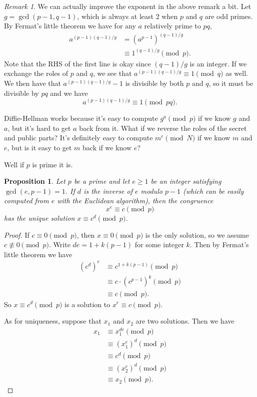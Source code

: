 \documentclass[12pt]{article}
\theoremstyle{plain}
\newtheorem{proposition}[theorem]{Proposition}
\theoremstyle{definition}
\theoremstyle{remark}
\newtheorem{remark}[theorem]{Remark}
\begin{document}
\begin{remark}\label{divide by gcd}
    We can actually improve the exponent in the above remark a bit.
    Let $g = \gcd(p-1, q-1)$, which is always at least 2 when $p$ and $q$ are odd primes.
    By Fermat's little theorem we have for any $a$ relatively prime to $pq$,
    \begin{align*}
        a^{(p-1)(q-1)/g} &= \left(a^{p-1}\right)^{(q-1)/g}\\
        &\equiv 1^{(q-1)/g}\pmod p.
    \end{align*}
    Note that the RHS of the first line is okay since $(q-1)/g$ is an integer.
    If we exchange the roles of $p$ and $q$, we see that $a^{(p-1)(q-1)/g} \equiv 1\pmod q$ as well.
    We then have that $a^{(p-1)(q-1)/g}-1$ is divisible by both $p$ and $q$, so it must be divisible by $pq$ and we have
    \[
        a^{(p-1)(q-1)/g}\equiv 1\pmod {pq}.
    \]
\end{remark}


Diffie-Hellman works because it's easy to compute $g^a\pmod p$ if we know $g$ and $a$, but it's hard to get $a$ back from it.
What if we reverse the roles of the secret and public parts?
It's definitely easy to compute $m^e\pmod N$ if we know $m$ and $e$, but is it easy to get $m$ back if we know $e$?

Well if $p$ is prime it is.

\begin{proposition}\label{roots mod p}
    Let $p$ be a prime and let $e\geq 1$ be an integer satisfying $\gcd(e, p-1) = 1$.
    If $d$ is the inverse of $e$ modulo $p-1$ (which can be easily computed from $e$ with the Euclidean algorithm), then the congruence
    \[
        x^e \equiv c\pmod p
    \]
    has the unique solution $x \equiv c^d\pmod p$.
\end{proposition}
\begin{proof}
    If $c\equiv 0\pmod p$, then $x\equiv 0\pmod p$ is the only solution, so we assume $c\not\equiv 0\pmod p$.
    Write $de = 1+k(p-1)$ for some integer $k$.
    Then by Fermat's little theorem we have
    \begin{align*}
        (c^d)^e &\equiv c^{1+k(p-1)}\pmod p\\
        &\equiv c\cdot (c^{p-1})^k\pmod p\\
        &\equiv c\pmod p.
    \end{align*}
    So $x\equiv c^d\pmod p$ is a solution to $x^e\equiv c\pmod p$.

    As for uniqueness, suppose that $x_1$ and $x_2$ are two solutions.
    Then we have
    \begin{align*}
        x_1 &\equiv x_1^{de}\pmod p\\
        &\equiv (x_1^e)^d\pmod p\\
        &\equiv c^d\pmod p\\
        &\equiv (x_2^e)^d\pmod p\\
        &\equiv x_2\pmod p.
    \end{align*}
\end{proof}
\end{document}
